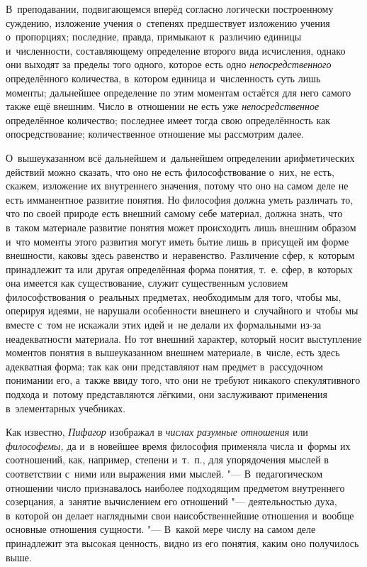 В~преподавании, подвигающемся вперёд согласно логически построенному суждению,
изложение учения о~степенях предшествует изложению учения о~пропорциях;
последние, правда, примыкают к~различию единицы и~численности, составляющему
определение второго вида исчисления, однако они выходят за пределы того одного,
которое есть одно {\em непосредственного} определённого количества, в~котором
единица и~численность суть лишь моменты; дальнейшее определение по этим
моментам остаётся для него самого также ещё внешним. Число в~отношении не
есть уже {\em непосредственное} определённое количество; последнее имеет тогда
свою определённость как опосредствование; количественное отношение мы
рассмотрим далее.

О~вышеуказанном всё дальнейшем и~дальнейшем определении арифметических действий
можно сказать, что оно не есть философствование о~них, не есть, скажем,
изложение их внутреннего значения, потому что оно на самом деле не есть
имманентное развитие понятия. Но философия должна уметь различать то, что по
своей природе есть внешний самому себе материал, должна знать, что в~таком
материале развитие понятия может происходить лишь внешним
образом и~что моменты этого развития могут иметь бытие лишь в~присущей
им форме внешности, каковы здесь равенство и~неравенство. Различение
сфер, к~которым принадлежит та или другая определённая форма понятия, т.~е.
сфер, в~которых она имеется как существование, служит существенным условием
философствования о~реальных предметах, необходимым для того, чтобы мы, оперируя идеями, не
нарушали особенности внешнего и~случайного и~чтобы мы вместе с~том не искажали
этих идей и~не делали их формальными из-за неадекватности материала.
Но тот внешний характер, который носит выступление моментов понятия в
вышеуказанном внешнем материале, в~числе, есть здесь адекватная форма; так
как они представляют нам предмет в~рассудочном понимании его, а~также ввиду того, что
они не требуют никакого спекулятивного подхода и~потому представляются лёгкими,
они заслуживают применения в~элементарных учебниках.


Как известно, {\em Пифагор} изображал в {\em числах разумные отношения} или
{\em философемы,} да и~в новейшее время философия применяла числа и~формы их
соотношений, как, например, степени и~т.~п., для упорядочения мыслей в
соответствии с~ними или выражения ими мыслей. "--- В~педагогическом отношении число признавалось
наиболее подходящим предметом внутреннего созерцания, а~занятие вычислением его
отношений "--- деятельностью духа, в~которой он делает наглядными свои
наисобственнейшие отношения и~вообще основные отношения сущности. "--- В~какой
мере числу на самом деле принадлежит эта высокая ценность, видно из его
понятия, каким оно получилось выше.

